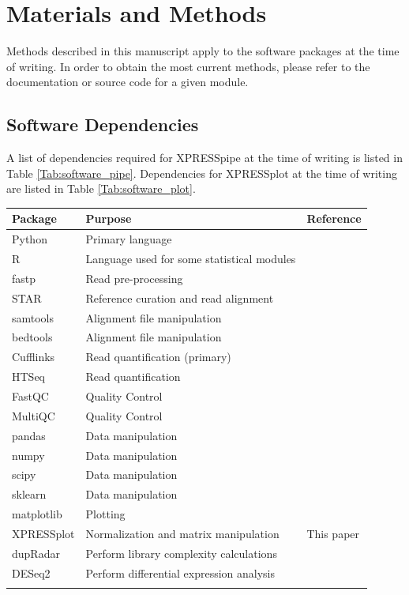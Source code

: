 \documentclass[11pt, a4paper, oneside]{article}
\begin{document}
\section{Materials and Methods}
Methods described in this manuscript apply to the software packages at the time of writing. In order to obtain the most current methods, please refer to the documentation or source code for a given module.

\subsection{Software Dependencies}
A list of dependencies required for XPRESSpipe at the time of writing is listed in Table \ref{Tab:software_pipe}. Dependencies for XPRESSplot at the time of writing are listed in Table \ref{Tab:software_plot}.

\begin{tabular}{p{2.4cm}p{7.5cm}p{3cm}}
 \textbf{Package} & \textbf{Purpose} & \textbf{Reference} \\
 \hline
 Python & Primary language & \\
 \hline
 R & Language used for some statistical modules & \\
 \hline
 fastp & Read pre-processing & \cite{fastp} \\
 \hline
 STAR & Reference curation and read alignment & \cite{star} \\
 \hline
 samtools & Alignment file manipulation & \cite{samtools} \\
 \hline
 bedtools & Alignment file manipulation & \cite{bedtools} \\
 \hline
 Cufflinks & Read quantification (primary) & \cite{cufflinks} \\
 \hline
 HTSeq & Read quantification & \cite{htseq} \\
 \hline
 FastQC & Quality Control & \cite{fastqc} \\
 \hline
 MultiQC & Quality Control & \cite{multiqc} \\
 \hline
 pandas & Data manipulation & \cite{pandas} \\
 \hline
 numpy & Data manipulation & \cite{numpy1, numpy2} \\
 \hline
 scipy & Data manipulation & \cite{scipy} \\
 \hline
 sklearn & Data manipulation & \cite{sklearn} \\
 \hline
 matplotlib & Plotting & \cite{matplotlib} \\
 \hline
 XPRESSplot & Normalization and matrix manipulation & This paper \\
 \hline
 dupRadar & Perform library complexity calculations & \cite{dupradar} \\
 \hline
 DESeq2 & Perform differential expression analysis & \cite{deseq2} \\
 \label{Tab:software_pipe}
\end{tabular}
\newline
\end{document}
